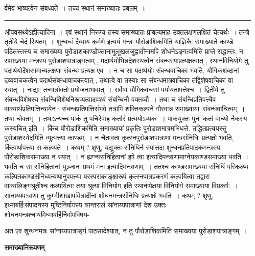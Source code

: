 \documentclass[11pt, openany]{book}
\begin{document}
\newpage
\fancyhead[LO]{विनियोगः ]}
{\bl\noindent
र्वमेव भाव्यत्वेन संबध्यते~। तच्च स्थानं समाख्यातः प्रबलम्~।}\\
\hrule
\vspace{3mm}
\noindent
{\br औपवसथ्येऽह्नीत्यादिना~।} एवं स्थानं निरूप्य तस्य समाख्यातः प्राबल्यमाह  उक्तलक्षणलक्षितं चेत्यर्थः~। तन्त्रे तृतीये चेदं स्थितम्~। {\qt शुन्धध्वं दैव्याय कर्मणे} इत्ययं मन्त्रः पौरोडाशिकमिति याज्ञिकैः समाख्याते काण्डे पठितस्तस्य च समाख्यया पुरोडाशकाण्डोक्तानामुलूखलजुह्वादीनामपि शोधनेऽङ्गत्वमिति प्राप्ते राद्धान्तः, न समाख्यया मन्त्रस्य पुरोडाशपात्राङ्गत्वम् , पदार्थयोभिन्नदेशस्थत्वेन संबन्धस्याप्रत्यक्षत्वात् , स्थानविनियोगे तु पदार्थयोर्देशसामान्यलक्षणः संबन्धः प्रत्यक्ष एव~। न च सा पदार्थयोः संबन्धवाचिका भवति, यौगिकशब्दानां द्रव्यवाचकत्वेन पदार्थसंबन्धावाचकत्वात्
, तथात्वे वा तस्याः सा संबन्धमात्रवाचिका तद्विशेषवाचिका वा स्यात्~। नाद्यः; तन्मात्रोक्तो प्रयोजनाभावात्~। सर्वेषां यौगिकवचसां पर्यायतापत्तेश्च~। द्वितीये तु संबन्धविशेषस्य
संबन्धिविशेषनिरूप्यत्वादवश्यं संबन्धिनौ वक्तव्यौ~। तथा च संबन्धिप्रतिपत्त्यैव वाक्यार्थप्रतिपत्तिन्यायेन : संबन्धप्रतिपत्तिसंभवे तत्रापि शक्तिकल्पने गौरवान्न समाख्यायाः संबन्धवाचित्वम्~। तथा चोक्तम्~। तथाऽन्यच्च {\qt पाकं तु पचिरेवाह कर्तारं प्रत्ययोऽप्यकः~। पाकयुक्तः पुनः कर्ता वाच्यो नैकस्य कस्यचित्} इति~। किंच पौरोडाशिकमिति समाख्यायां प्रकृतिः पुरोडाशमात्रमभिधत्ते, तद्धितप्रत्ययस्तु
पुरोडाशस्येदमिति व्युत्पत्त्या काण्डम्~। न चैतावता कृत्स्नपुरोडाशपात्राणां मन्त्रसंनिधिः प्रत्यक्षो भवति, किंत्वर्थापत्त्या स कल्प्यते~। कथम् ? शृणु, यद्युक्तः संनिधिर्न स्यात्तदा
शुन्धनप्रतिपादकमन्त्रस्य पौरोडाशिकसमाख्या न स्यात्~। न ह्यग्न्यसंनिहितानां {\qt इषे त्वा} इत्यादिमन्त्राणामाग्नेयकाण्डसमाख्या भवति~। भवति च सा संनिहितानां {\qt युञ्जानः प्रथमं मनः} इत्यादिमन्त्राणाम्~। ततश्च काण्डसमाख्यया संनिधिं परिकल्प्य कल्पितकाण्डसंनिध्यन्यथानुपपत्त्या परस्पराकाङ्क्षारूपं कृत्स्नपात्रप्रकरणं कल्पयित्वा तद्वारा
वाक्यलिङ्गश्रुतीश्च कल्पयित्वा तया श्रुत्या विनियोग इति स्थानापेक्षया विनियोगे समाख्याया विप्रकर्षः~। सांनाय्यपात्राणां तु कुम्भीशाखापवित्रादीनां शोधनमन्त्रसंनिधिः प्रत्यक्षो भवति~। कथम् ? शृणु, इध्माबर्हिःसंपादनस्य मुष्टिनिर्वापस्य चान्तरालं सांनाय्यपात्राणां देश उक्तः शोधनमन्त्रश्चायमिध्माबर्हिर्निर्वापविषय-

\newpage
\lfoot{}
\fancyhead[RE]{[ समाख्यानिरूपणम् ]}
{\bl\noindent अत एव शुन्धनमत्रः सांनाय्यपात्राङ्गं पाठसादेश्यात्, न तु पौरोडाशिकमिति समाख्यया पुरोडाशपात्राङ्गम्~।}
\begin{center}
 \textbf{समाख्यानिरूपणम्}   
\end{center}
 
\end{document}
